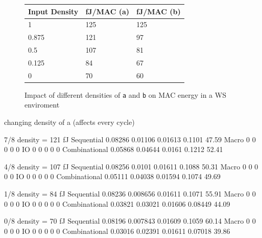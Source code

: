 \documentclass[sigconf]{acmart}
\begin{document}
\begin{figure}
\begin{tabular}{l l l}
  \textbf{Input Density} & \textbf{fJ/MAC (a)} & \textbf{fJ/MAC (b)} \\
  \toprule
  1 & 125 & 125 \\ \midrule
  0.875 & 121 & 97 \\ \midrule
  0.5 & 107 & 81 \\ \midrule
  0.125 & 84 & 67 \\ \midrule
  0 & 70 & 60 \\
  \bottomrule
\end{tabular}
\caption{Impact of different densities of \texttt{a} and \texttt{b} on MAC energy in a WS enviroment}
\label{fig:density_mac}
\end{figure}




\iffalse
changing density of a (affects every cycle)

7/8 density = 121 fJ
Sequential                     0.08286      0.01106       0.01613      0.1101       47.59
Macro                                0            0             0           0           0
IO                                   0            0             0           0           0
Combinational                  0.05868      0.04644        0.0161      0.1212       52.41

4/8 density = 107 fJ
Sequential                     0.08256       0.0101       0.01611      0.1088       50.31
Macro                                0            0             0           0           0
IO                                   0            0             0           0           0
Combinational                  0.05111      0.04038       0.01594      0.1074       49.69

1/8 density = 84 fJ
Sequential                     0.08236     0.008656       0.01611      0.1071       55.91
Macro                                0            0             0           0           0
IO                                   0            0             0           0           0
Combinational                  0.03821      0.03021       0.01606     0.08449       44.09

0/8 density = 70 fJ
Sequential                     0.08196     0.007843       0.01609      0.1059       60.14
Macro                                0            0             0           0           0
IO                                   0            0             0           0           0
Combinational                  0.03016      0.02391       0.01611     0.07018       39.86
\end{document}

